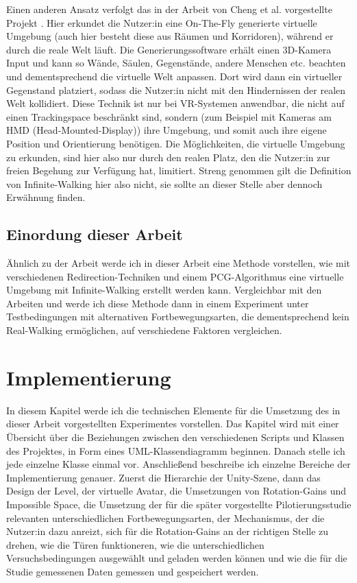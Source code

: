 Einen anderen Ansatz verfolgt das in der Arbeit \cite{microsoft} von Cheng et al. vorgestellte Projekt .
Hier erkundet die Nutzer:in eine On-The-Fly generierte virtuelle Umgebung (auch hier besteht diese aus Räumen und Korridoren), während er durch die reale Welt läuft. Die Generierungssoftware erhält einen 3D-Kamera Input und kann so Wände, Säulen, Gegenstände, andere Menschen etc. beachten und dementsprechend die virtuelle Welt anpassen. Dort wird dann ein virtueller Gegenstand platziert, sodass die Nutzer:in nicht mit den Hindernissen der realen Welt kollidiert.
Diese Technik ist nur bei VR-Systemen anwendbar, die nicht auf einen Trackingspace beschränkt sind, sondern (zum Beispiel mit Kameras am HMD (Head-Mounted-Display)) ihre Umgebung, und somit auch ihre eigene Position und Orientierung benötigen. Die Möglichkeiten, die virtuelle Umgebung zu erkunden, sind hier also nur durch den realen Platz, den die Nutzer:in zur freien Begehung zur Verfügung hat, limitiert. Streng genommen gilt die Definition von Infinite-Walking hier also nicht, sie sollte an dieser Stelle aber dennoch Erwähnung finden.

\section{Einordung dieser Arbeit}
Ähnlich zu der Arbeit \cite{flexible-spaces} werde ich in dieser Arbeit eine Methode vorstellen, wie mit verschiedenen Redirection-Techniken und einem PCG-Algorithmus eine virtuelle Umgebung mit Infinite-Walking erstellt werden kann.
Vergleichbar mit den Arbeiten \cite{peck-vergleich-2011} und \cite{langbehn-vergleich-2018} werde ich diese Methode dann in einem Experiment unter Testbedingungen mit alternativen Fortbewegungsarten, die dementsprechend kein Real-Walking ermöglichen, auf verschiedene Faktoren vergleichen.

\chapter{Implementierung}\label{chapter:implementation}

In diesem Kapitel werde ich die technischen Elemente für die Umsetzung des in dieser Arbeit vorgestellten Experimentes vorstellen.
Das Kapitel wird mit einer Übersicht über die Beziehungen zwischen den verschiedenen Scripts und Klassen des Projektes, in Form eines UML-Klassendiagramm beginnen.
Danach stelle ich jede einzelne Klasse einmal vor.
Anschließend beschreibe ich einzelne Bereiche der Implementierung genauer.
Zuerst die Hierarchie der Unity-Szene, dann das Design der Level, der virtuelle Avatar, die Umsetzungen von Rotation-Gains und Impossible Space, die Umsetzung der für die später vorgestellte Pilotierungsstudie relevanten unterschiedlichen Fortbewegungsarten, der Mechanismus, der die Nutzer:in dazu anreizt, sich für die Rotation-Gains an der richtigen Stelle zu drehen, wie die Türen funktioneren, wie die unterschiedlichen Versuchsbedingungen ausgewählt und geladen werden können und wie die für die Studie gemessenen Daten gemessen und gespeichert werden.

